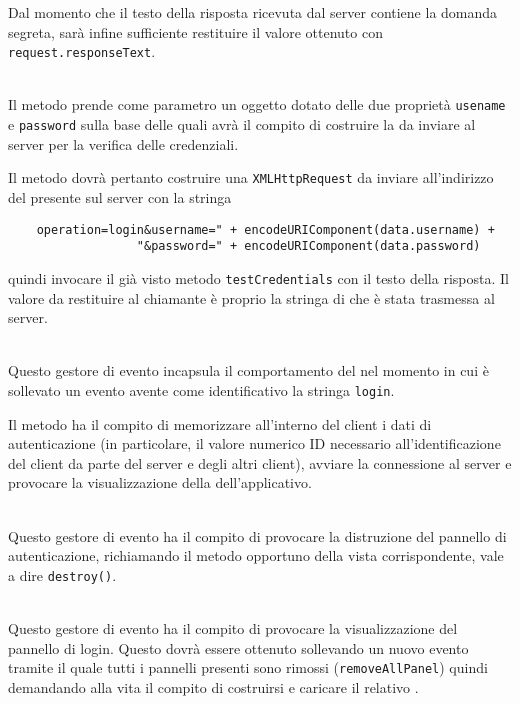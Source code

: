 \begin{description}
Dal momento che il testo della risposta ricevuta dal server contiene la domanda segreta, sarà infine sufficiente restituire il valore ottenuto con \verb+request.responseText+.

\item{}\\
Il metodo prende come parametro un oggetto dotato delle due proprietà \verb+usename+ e \verb+password+ sulla base delle quali avrà il compito di costruire la  da inviare al server per la verifica delle credenziali.

Il metodo dovrà pertanto costruire una \verb+XMLHttpRequest+ da inviare all'indirizzo del  presente sul server con la stringa
\begin{verbatim}
    operation=login&username=" + encodeURIComponent(data.username) +
                  "&password=" + encodeURIComponent(data.password)
\end{verbatim}
quindi invocare il già visto metodo \verb+testCredentials+ con il testo della risposta. Il valore da restituire al chiamante è proprio la stringa di  che è stata trasmessa al server.

\item{}\\
Questo gestore di evento incapsula il comportamento del  nel momento in cui è sollevato un evento avente come identificativo la stringa \verb'login'.

Il metodo ha il compito di memorizzare all'interno del client i dati di autenticazione (in particolare, il valore numerico ID necessario all'identificazione del client da parte del server e degli altri client), avviare la connessione al server e provocare la visualizzazione della  dell'applicativo.

\item{}\\
Questo gestore di evento ha il compito di provocare la distruzione del pannello di autenticazione, richiamando il metodo opportuno della vista corrispondente, vale a dire \verb+destroy()+.

\item{}\\
Questo gestore di evento ha il compito di provocare la visualizzazione del pannello di login. Questo dovrà essere ottenuto sollevando un nuovo evento tramite il quale tutti i pannelli presenti sono rimossi (\verb'removeAllPanel') quindi demandando alla vita il compito di costruirsi e caricare il relativo .


\end{description}
